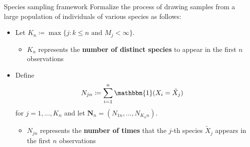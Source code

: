 \documentclass[11pt, handout]{beamer}
\begin{document}
\begin{frame}[t]{Species sampling framework}
    Formalize the process of drawing samples from a large population of individuals of various species as follows:
    \begin{itemize}
        \item<1-> Let \(K_n \coloneqq \max\{j \colon k \leq n \text{ and } M_j < \infty\}\).
        \begin{itemize}
            \item \(K_n\) represents the \textbf{number of distinct species} to appear in the first \(n\) observations
        \end{itemize}
        \item<2-> Define
        \begin{equation*}
            N_{jn} \coloneqq \sum_{i=1}^n \mathbbm{1}(X_i = \tilde{X}_j)
        \end{equation*}
        for \(j = 1,...,K_n\) and let \(\mathbf{N}_{n} = (N_{1n},...,N_{K_n n})\).
        \begin{itemize}
            \item \(N_{jn}\) represents the \textbf{number of times} that the \(j\)-th species \(\tilde{X}_j\) appears in the first \(n\) observations
        \end{itemize}
    \end{itemize}
\end{frame}
\end{document}
